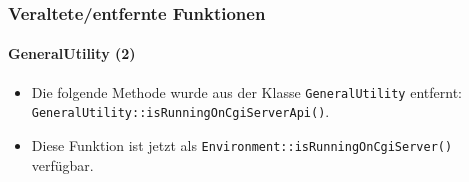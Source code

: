 
\begin{frame}[fragile]
	\frametitle{Veraltete/entfernte Funktionen}
	\framesubtitle{GeneralUtility (2)}

	\begin{itemize}
		\item Die folgende Methode wurde aus der Klasse \texttt{GeneralUtility} entfernt:
			\texttt{GeneralUtility::isRunningOnCgiServerApi()}.
		\item Diese Funktion ist jetzt als\newline
			\texttt{Environment::isRunningOnCgiServer()} verfügbar.

	\end{itemize}

\end{frame}



